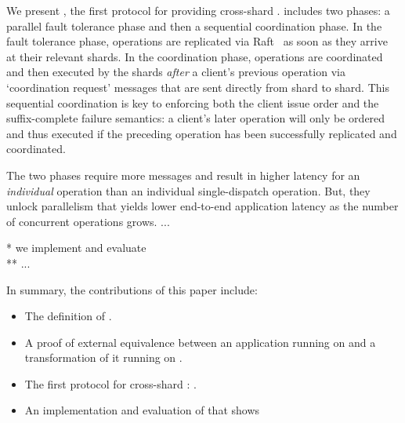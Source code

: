 We present \sys{}, the first protocol for providing cross-shard \mdl{}.
\sys{} includes two phases: a parallel fault tolerance phase and then a sequential coordination phase.
In the fault tolerance phase, operations are replicated via Raft~\cite{raft} as soon as they arrive at their relevant shards.
In the coordination phase, operations are coordinated and then executed by the shards \textit{after} a client's previous operation via `coordination request' messages that are sent directly from shard to shard.
This sequential coordination is key to enforcing both the client issue order and the suffix-complete failure semantics:
a client's later operation will only be ordered and thus executed if the preceding operation has been successfully replicated and coordinated.

The two phases require more messages and result in higher latency for an \textit{individual} operation than an individual single-dispatch operation.
But, they unlock parallelism that yields lower end-to-end application latency as the number of concurrent operations grows.
...

%



* we implement and evaluate \sys{}\\
** ...

In summary, the contributions of this paper include:
\begin{itemize}[leftmargin=*]
\item The definition of \mdllong{}.
\item A proof of external equivalence between an application running on \sdl{} and a transformation of it running on \mdl{}.
\item The first protocol for cross-shard \mdl{}: \sys{}.
\item An implementation and evaluation of \sys{} that shows 
\end{itemize}
